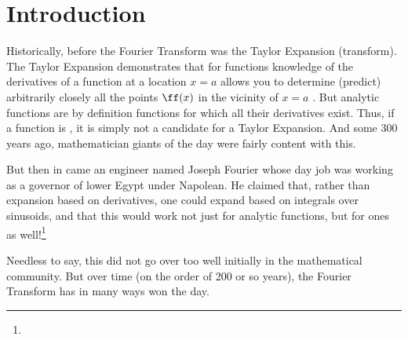 \section{Introduction}
Historically, before the Fourier Transform was the Taylor Expansion (transform).
The Taylor Expansion demonstrates that for  functions
knowledge of the derivatives of a function at a location $x=a$
allows you to determine (predict) arbitrarily closely all the points $\ff(x)$ in the vicinity of $x=a$ .
But analytic functions are by definition functions for which all their derivatives exist.
Thus, if a function is , it is simply not a candidate for a Taylor Expansion.
And some 300 years ago, mathematician giants of the day were fairly content with this.

But then in came an engineer named Joseph Fourier whose day job was working as a governor of lower Egypt under Napolean.
He claimed that, rather than expansion based on derivatives, one could expand based on integrals over sinusoids,
and that this would work not just for analytic functions, but for  ones as well!\footnote{}

\begin{minipage}{\tw-80mm}
Needless to say, this did not go over too well initially in the mathematical community.
But over time (on the order of 200 or so years), the Fourier Transform has in many ways won the day.
\end{minipage}\hfill%

